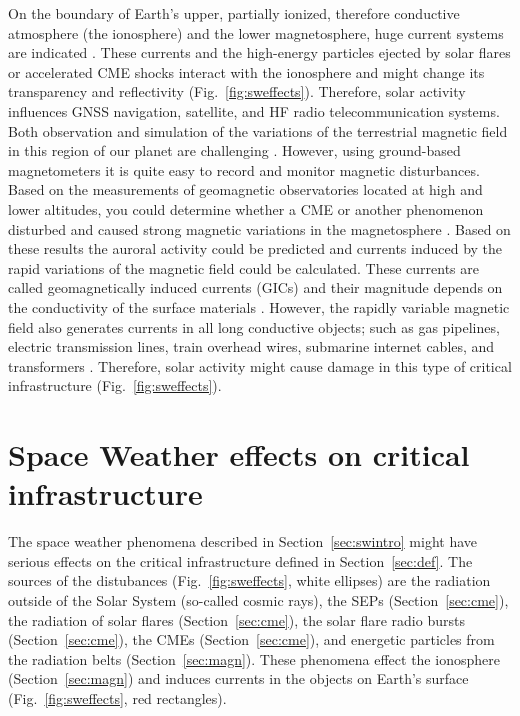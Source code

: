 \documentclass[sn-aps]{sn-jnl}%
\begin{document}
On the boundary of Earth's upper, partially ionized, therefore conductive atmosphere (the ionosphere) and the lower magnetosphere, huge current systems are indicated \cite{juusola14:_statis_gumic_mhd}. These currents and the high-energy particles ejected by solar flares or accelerated CME shocks interact with the ionosphere and might change its transparency and reflectivity (Fig.~\ref{fig:sweffects}). Therefore, solar activity influences GNSS navigation, satellite, and HF radio telecommunication systems\cite{scherer05:_space_weath}. Both observation and simulation of the variations of the terrestrial magnetic field in this region of our planet are challenging \cite{facsko16:_one_earth}. However, using ground-based magnetometers it is quite easy to record and monitor magnetic disturbances. Based on the measurements of geomagnetic observatories located at high and lower altitudes, you could determine whether a CME or another phenomenon disturbed and caused strong magnetic variations in the magnetosphere \cite{scherer05:_space_weath}. Based on these results the auroral activity could be predicted and currents induced by the rapid variations of the magnetic field could be calculated. These currents are called geomagnetically induced currents (GICs) and their magnitude depends on the conductivity of the surface materials \cite{scherer05:_space_weath}. However, the rapidly variable magnetic field also generates currents in all long conductive objects; such as gas pipelines, electric transmission lines, train overhead wires, submarine internet cables, and transformers \cite{scherer05:_space_weath}. Therefore, solar activity might cause damage in this type of critical infrastructure (Fig.~\ref{fig:sweffects}).

\section{Space Weather effects on critical infrastructure}
\label{sec:sweci}

The space weather phenomena described in Section~\ref{sec:swintro} might have serious effects on the critical infrastructure defined in Section~\ref{sec:def}. The sources of the distubances (Fig.~\ref{fig:sweffects}, white ellipses) are the radiation outside of the Solar System (so-called cosmic rays), the SEPs (Section~\ref{sec:cme}), the radiation of solar flares (Section~\ref{sec:cme}), the solar flare radio bursts (Section~\ref{sec:cme}), the CMEs (Section~\ref{sec:cme}), and energetic particles from the radiation belts (Section~\ref{sec:magn}). These phenomena effect the ionosphere (Section~\ref{sec:magn}) and induces currents in the objects on Earth's surface (Fig.~\ref{fig:sweffects}, red rectangles). 
\end{document}
